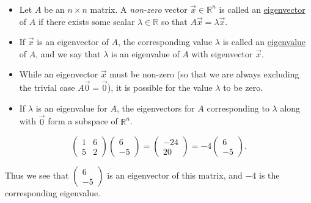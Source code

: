 \begin{frame}[fragile]\frametitle{}
 \begin{itemize}
\item Let $A$ be an $n \times n$ matrix.  A {\em non-zero} vector $\vec{x}\in \mathbb{R}^n$ is 
called an \underline{eigenvector} of $A$ if there exists some scalar $\lambda \in \mathbb{R}$ so that 
$A \vec{x}= \lambda \vec{x}$.  \\ 
\item If $\vec{x}$ is an eigenvector of $A$,
the corresponding value $\lambda$ is called an \underline{eigenvalue} of $A$, and we say that 
$\lambda$ is an eigenvalue of $A$ with eigenvector $\vec{x}$.  

\item 
While an eigenvector $\vec{x}$ must be non-zero (so that we are always 
excluding the trivial case $A \vec{0}=\vec{0}$), it is possible for the value
$\lambda$ to be zero. 
\item  If $\lambda$ is an eigenvalue for $A$, the eigenvectors for $A$ corresponding to $\lambda$ along with $\vec{0}$ form a subspace of $\mathbb{R}^n$.
\end{itemize}




 \begin{definition}
 \[
 \left( \begin{array}{rrrrr} 
  1 & 6 \\ 5 & 2
 \end{array} \right)
 \left( \begin{array}{rrrrr} 
  6 \\-5 
 \end{array} \right)
=
 \left( \begin{array}{rrrrr} 
  -24 \\ 20
 \end{array} \right)
=
-4 \left( \begin{array}{rrrrr} 
  6 \\ -5
 \end{array} \right).
\]


Thus we see that $\left( \begin{array}{rrrrr} 
  6 \\ -5
 \end{array} \right)$ is an eigenvector of this matrix, and $-4$ is the corresponding eigenvalue.

 \end{definition}
\end{frame}


